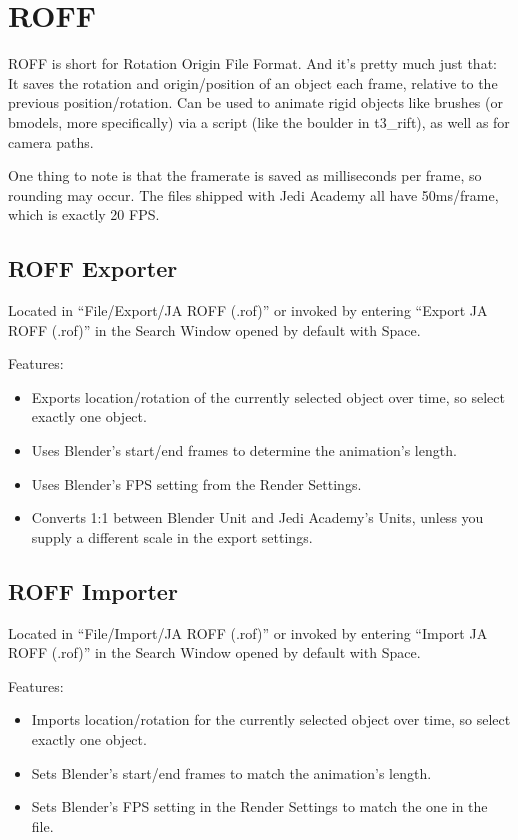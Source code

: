 \documentclass[a4paper,10pt]{article}
\begin{document}
 \section{ROFF}
 
 ROFF is short for Rotation Origin File Format. And it's pretty much just that: It saves the rotation and
 origin/position of an object each frame, relative to the previous position/rotation. Can be used to animate
 rigid objects like brushes (or bmodels, more specifically) via a script (like the boulder in t3\_rift), as
 well as for camera paths.
 
 One thing to note is that the framerate is saved as milliseconds per frame, so rounding may occur. The
 files shipped with Jedi Academy all have 50ms/frame, which is exactly 20 FPS.
 
 \subsection{ROFF Exporter}
 
 Located in ``File/Export/JA ROFF (.rof)'' or invoked by entering ``Export JA ROFF (.rof)'' in the Search Window
 opened by default with Space.
 
 Features:
 \begin{itemize}
  \item Exports location/rotation of the currently selected object over time, so select exactly one object.
  \item Uses Blender's start/end frames to determine the animation's length.
  \item Uses Blender's FPS setting from the Render Settings.
  \item Converts 1:1 between Blender Unit and Jedi Academy's Units, unless you supply a different scale in
  the export settings.
 \end{itemize}

 \subsection{ROFF Importer}
 
 Located in ``File/Import/JA ROFF (.rof)'' or invoked by entering ``Import JA ROFF (.rof)'' in the Search Window
 opened by default with Space.
 
 Features:
 \begin{itemize}
  \item Imports location/rotation for the currently selected object over time, so select exactly one object.
  \item Sets Blender's start/end frames to match the animation's length.
  \item Sets Blender's FPS setting in the Render Settings to match the one in the file.
 \end{itemize}
 
\end{document}
